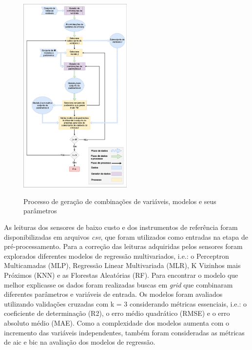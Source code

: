\begin{figure}[h!]
    \centering
    \caption{Processo de geração de combinações de variáveis, modelos e seus parâmetros}
    \includegraphics[width=0.5\textwidth]{chapters/4-CALIBRAÇÃO MÚLTIPLOS SENSORES/Figuras/Fluxograma busca em Grid.png}
    \label{fig:grid-search}
\end{figure}

As leituras dos sensores de baixo custo e dos instrumentos de referência foram disponibilizadas em arquivos \textit{csv}, que foram utilizados como entradas na etapa de pré-processamento. Para a correção das leituras adquiridas pelos sensores foram explorados diferentes modelos de regressão multivariados, i.e.: o Perceptron Multicamadas (MLP), Regressão Linear Multivariada (MLR), K Vizinhos mais Próximos (KNN) e as Florestas Aleatórias (RF). Para encontrar o modelo que melhor explicasse os dados foram realizadas buscas em \textit{grid} que combinaram diferentes parâmetros e variáveis de entrada. Os modelos foram avaliados utilizando validações cruzadas com k = 3 considerando métricas essenciais, i.e.: o coeficiente de determinação (R2), o erro médio quadrático (RMSE) e o erro absoluto médio (MAE). Como a complexidade dos modelos aumenta com o incremento das variáveis independentes, também foram consideradas as métricas de \acrshort{aic} e \acrshort{bic} na avaliação dos modelos de regressão.

